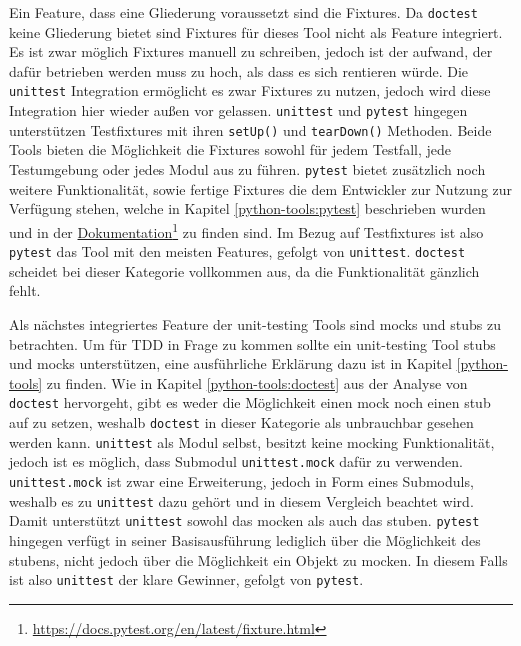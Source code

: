 Ein Feature, dass eine Gliederung voraussetzt sind die Fixtures. Da
\lstinline{doctest} keine Gliederung bietet sind Fixtures für dieses Tool
nicht als Feature integriert. Es ist zwar möglich Fixtures manuell zu
schreiben, jedoch ist der aufwand, der dafür betrieben werden muss zu hoch, als
dass es sich rentieren würde. Die \lstinline{unittest} Integration ermöglicht es
zwar Fixtures zu nutzen, jedoch wird diese Integration hier wieder außen vor
gelassen. \lstinline{unittest} und \lstinline{pytest} hingegen unterstützen
Testfixtures mit ihren \lstinline{setUp()} und \lstinline{tearDown()} Methoden.
Beide Tools bieten die Möglichkeit die Fixtures sowohl für jedem Testfall, jede
Testumgebung oder jedes Modul aus zu führen. \lstinline{pytest} bietet
zusätzlich noch weitere Funktionalität, sowie fertige Fixtures die dem
Entwickler zur Nutzung zur Verfügung stehen, welche in Kapitel
\ref{python-tools:pytest} beschrieben wurden und in der
\href{https://docs.pytest.org/en/latest/fixture.html}{Dokumentation}\footnote{\url{https://docs.pytest.org/en/latest/fixture.html}}
zu finden sind. Im Bezug auf Testfixtures ist also \lstinline{pytest} das Tool
mit den meisten Features, gefolgt von \lstinline{unittest}. \lstinline{doctest}
scheidet bei dieser Kategorie vollkommen aus, da die Funktionalität gänzlich
fehlt.

Als nächstes integriertes Feature der unit-testing Tools sind \Glspl{mock} und
\Glspl{stub} zu betrachten. Um für TDD in Frage zu kommen sollte ein
unit-testing Tool \Glspl{stub} und \Glspl{mock} unterstützen, eine ausführliche
Erklärung dazu ist in Kapitel \ref{python-tools} zu finden. Wie in Kapitel
\ref{python-tools:doctest} aus der Analyse von \lstinline{doctest} hervorgeht,
gibt es weder die Möglichkeit einen \Gls{mock} noch einen \Gls{stub} auf zu
setzen, weshalb \lstinline{doctest} in dieser Kategorie als unbrauchbar gesehen
werden kann. \lstinline{unittest} als Modul selbst, besitzt keine \gls{mock}ing
Funktionalität, jedoch ist es möglich, dass Submodul \lstinline{unittest.mock}
dafür zu verwenden. \lstinline{unittest.mock} ist zwar eine Erweiterung, jedoch
in Form eines Submoduls, weshalb es zu \lstinline{unittest} dazu gehört und in
diesem Vergleich beachtet wird. Damit unterstützt \lstinline{unittest} sowohl
das \gls{mock}en als auch das \gls{stub}en. \lstinline{pytest} hingegen verfügt
in seiner Basisausführung lediglich über die Möglichkeit des \gls{stub}ens,
nicht jedoch über die Möglichkeit ein Objekt zu \gls{mock}en. In diesem Falls
ist also \lstinline{unittest} der klare Gewinner, gefolgt von
\lstinline{pytest}.


